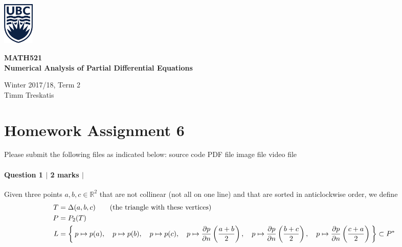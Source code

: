 \documentclass[10pt,letterpaper]{scrartcl}
\begin{document}
\begin{minipage}{.2\textwidth}
\includegraphics[width=42pt]{ubc-logo.png}
\end{minipage}
\hfill
\begin{minipage}{.75\textwidth}
\setlength{\parskip}{6pt}
\begin{flushright}
{\sffamily
\textbf{MATH521}\\
\textbf{Numerical Analysis of Partial Differential Equations}

Winter 2017/18, Term 2\\
Timm Treskatis
}
\end{flushright}
\end{minipage}

\section*{Homework Assignment 6}

Please submit the following files as indicated below: \hfill \faFileCodeO \: source code \hfill \faFilePdfO \: PDF file \hfill \faFilePictureO \: image file \hfill \faFileMovieO \: video file

\paragraph*{Question 1 $\vert$ 2 marks $\vert$ \faFilePdfO}

Given three points $a,b,c \in \mathds{R}^2$ that are not collinear (not all on one line) and that are sorted in anticlockwise order, we define
\begin{align*}
T &= \Delta(a,b,c) \qquad \text{(the triangle with these vertices)}\\
P &= P_2(T)\\
L &= \Set{ p\mapsto p(a), \quad
 p\mapsto p(b),\quad
 p\mapsto p(c),\quad
 p\mapsto \frac{\partial p}{\partial n}\left(\frac{a+b}{2}\right),\quad
 p\mapsto \frac{\partial p}{\partial n}\left(\frac{b+c}{2}\right),\quad
 p\mapsto \frac{\partial p}{\partial n}\left(\frac{c+a}{2}\right)} \subset P^*
\end{align*}

\begin{center}
\end{center}
\end{document}
